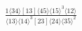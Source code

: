 \documentclass[varwidth, border=5pt]{standalone}
\begin{document}
\begin{my}
$\begin{gathered}
\scriptscriptstyle\frac{1⟨34⟩[13]⟨45⟩⟨15⟩^3⟨12⟩}{⟨13⟩⟨14⟩^3[23]⟨24⟩⟨35⟩^2}
\end{gathered}$
\end{my}
\end{document}
